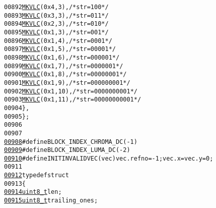 \begin{footnotesize}
\begin{alltt}
00892         \hyperlink{vlc_8h_aa680b26539d09b5954221ff39a127faa}{MKVLC}( 0x4, 3 ), \textcolor{comment}{/* str=100 */}
00893         \hyperlink{vlc_8h_aa680b26539d09b5954221ff39a127faa}{MKVLC}( 0x3, 3 ), \textcolor{comment}{/* str=011 */}
00894         \hyperlink{vlc_8h_aa680b26539d09b5954221ff39a127faa}{MKVLC}( 0x2, 3 ), \textcolor{comment}{/* str=010 */}
00895         \hyperlink{vlc_8h_aa680b26539d09b5954221ff39a127faa}{MKVLC}( 0x1, 3 ), \textcolor{comment}{/* str=001 */}
00896         \hyperlink{vlc_8h_aa680b26539d09b5954221ff39a127faa}{MKVLC}( 0x1, 4 ), \textcolor{comment}{/* str=0001 */}
00897         \hyperlink{vlc_8h_aa680b26539d09b5954221ff39a127faa}{MKVLC}( 0x1, 5 ), \textcolor{comment}{/* str=00001 */}
00898         \hyperlink{vlc_8h_aa680b26539d09b5954221ff39a127faa}{MKVLC}( 0x1, 6 ), \textcolor{comment}{/* str=000001 */}
00899         \hyperlink{vlc_8h_aa680b26539d09b5954221ff39a127faa}{MKVLC}( 0x1, 7 ), \textcolor{comment}{/* str=0000001 */}
00900         \hyperlink{vlc_8h_aa680b26539d09b5954221ff39a127faa}{MKVLC}( 0x1, 8 ), \textcolor{comment}{/* str=00000001 */}
00901         \hyperlink{vlc_8h_aa680b26539d09b5954221ff39a127faa}{MKVLC}( 0x1, 9 ), \textcolor{comment}{/* str=000000001 */}
00902         \hyperlink{vlc_8h_aa680b26539d09b5954221ff39a127faa}{MKVLC}( 0x1, 10 ), \textcolor{comment}{/* str=0000000001 */}
00903         \hyperlink{vlc_8h_aa680b26539d09b5954221ff39a127faa}{MKVLC}( 0x1, 11 ), \textcolor{comment}{/* str=00000000001 */}
00904     \},
00905 \};
00906 
00907 
\hypertarget{vlc_8h_source_l00908}{}\hyperlink{vlc_8h_a8970a37770d210d728339bc5696f28df}{00908} \textcolor{preprocessor}{#define BLOCK\_INDEX\_CHROMA\_DC   (-1)}
\hypertarget{vlc_8h_source_l00909}{}\hyperlink{vlc_8h_ad2d7f1b7e491db865767a2a38443091a}{00909} \textcolor{preprocessor}{}\textcolor{preprocessor}{#define BLOCK\_INDEX\_LUMA\_DC     (-2)}
\hypertarget{vlc_8h_source_l00910}{}\hyperlink{vlc_8h_ad5a55e11f34af0eea76d2129ca93b3d3}{00910} \textcolor{preprocessor}{}\textcolor{preprocessor}{#define INITINVALIDVEC(vec) vec.refno = -1; vec.x = vec.y = 0;}
00911 \textcolor{preprocessor}{}
\hypertarget{vlc_8h_source_l00912}{}\hyperlink{structvlc__coeff__token__t}{00912} \textcolor{keyword}{typedef} \textcolor{keyword}{struct  }
00913 \{
\hypertarget{vlc_8h_source_l00914}{}\hyperlink{structvlc__coeff__token__t_a44a0b097012b2c20f2c2da02dfe98e99}{00914}         \hyperlink{_types_8h_a363e4d606232036a6b89060813c45489}{uint8_t} len;
\hypertarget{vlc_8h_source_l00915}{}\hyperlink{structvlc__coeff__token__t_aa21454773dd262167cd9b110f1fe6b92}{00915}         \hyperlink{_types_8h_a363e4d606232036a6b89060813c45489}{uint8_t} trailing\_ones;

\end{alltt}
\end{footnotesize}
